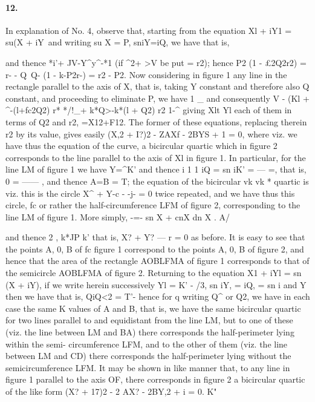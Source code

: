 \documentclass[11pt,a4paper]{book}
\begin{document}
{{{\paragraph{12.} In  explanation  of  No.  4,  observe  that,  starting  from  the  equation
Xl  +  iY1  =  su(X  +  iY\
and  writing  su  X  =  P,  sniY=iQ,  we  have
that  is,


and  thence
*i'+  JV-Y^y^-*1  (if  ^2+  >V  be  put  =  r2);
hence
P2  (1  -  £2Q2r2)  =  r-  -  Q\     Q-  (1  -  k-P2r-)  =  r2  -  P2.
Now  considering  in  figure  1  any  line  in  the  rectangle  parallel  to  the  axis  of  X,
that  is,  taking  Y  constant  and  therefore  also  Q  constant,  and  proceeding  to  eliminate
P,  we  have
1   \_
and  consequently
V  -  (Kl  +  ^-(l+fc2Q2)  r*  */!\_+  k*Q>-k*(l  +  Q2) r2
1-^
giving   Xlt   Yl  each    of  them   in    terms   of  Q2  and   r2,   =X12+F12.     The   former  of  these
equations,  replacing  therein  r2  by  its  value,  gives  easily
(X,2  +  I?)2  -  ZAXf  -  2BYS  + 1  =  0,
where
viz.   we   have   thus   the   equation   of    the    curve,   a   bicircular    quartic   which   in    figure    2
corresponds  to  the  line  parallel  to  the  axis  of  Xl  in  figure  1.
In    particular,    for  the    line    LM    of    figure     1     we     have     Y=^K'     and     thence
i  1                                           1
iQ  =  sn  iK' =  --- =,  that  is,  0  =  ------ ,  and  thence  A=B  =  T;    the  equation  of  the  bicircular
vk  vk                                        *
quartic  is
viz.   this    is    the    circle   X^  +  Y-c  -  -j-  =  0   twice   repeated,   and   we    have   thus   this   circle,
fc
or    rather    the   half-circumference   LFM  of  figure    2,    corresponding    to   the    line   LM  of
figure  1.     More  simply,
-=-  sn  X  +       cnX  dn  X
.
A/


and  thence
2  ,
k*JP  k'
that   is,   X?  +  Y?  ---  r  =  0   as   before.       It    is    easy   to    see    that    the    points   A,   0,    B   of
fc
figure  1  correspond  to  the  points  A,  0,  B  of  figure  2,  and  hence  that  the  area  of
the  rectangle  AOBLFMA  of  figure  1  corresponds  to  that  of  the  semicircle  AOBLFMA
of  figure  2.
Returning  to  the  equation  X1  +  iYl  =  sn  (X  +  iY),  if  we  write  herein  successively
Yl  =  K'  -  /3,     sn  iY,  =  iQ,  =  sn  i
and
Y
then  we  have
that    is,    QiQ<2  =  T'-    hence    for   q    writing    Q^    or   Q2,   we    have    in    each    case    the    same
K
values  of  A  and  B,  that  is,  we  have  the  same  bicircular  quartic  for  two  lines
parallel  to  and  equidistant  from  the  line  LM,  but  to  one  of  these  (viz.  the  line
between  LM  and  BA)  there  corresponds  the  half-perimeter  lying  within  the  semi-
circumference  LFM,  and  to  the  other  of  them  (viz.  the  line  between  LM  and  CD)
there  corresponds  the  half-perimeter  lying  without  the  semicircumference  LFM.
It   may   be   shown   in   like   manner   that,   to   any   line    in    figure    1    parallel    to    the
axis  OF,  there  corresponds  in  figure  2  a  bicircular  quartic  of  the  like  form
(X?  +  17)2  -  2  AX?  -  2BY,2  +  i  =  0.
K"
}}}
\end{document}

